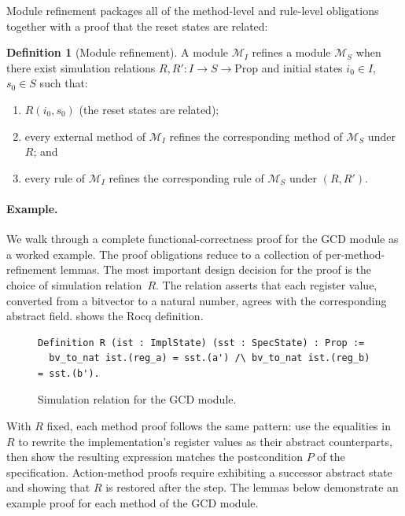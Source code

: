 \documentclass[fontset=fira-newtxsf]{mitthesis}
\theoremstyle{definition}
\newtheorem{definition}{Definition}[section]
\theoremstyle{plain}
\begin{document}
Module refinement packages all of the method-level and rule-level obligations together with a proof that the reset states are related:

\begin{definition}[Module refinement] \label{def:refines-module}
A module $\mathcal{M}_I$ refines a module $\mathcal{M}_S$ when there exist simulation relations $R, R' : I \to S \to \text{Prop}$ and initial states $i_0 \in I$, $s_0 \in S$ such that:
\begin{enumerate}
  \item $R(i_0, s_0)$ (the reset states are related);
  \item every external method of $\mathcal{M}_I$ refines the corresponding method of $\mathcal{M}_S$ under $R$; and
  \item every rule of $\mathcal{M}_I$ refines the corresponding rule of $\mathcal{M}_S$ under $(R, R')$.
\end{enumerate}
\end{definition}

\paragraph{Example.}
We walk through a complete functional-correctness proof for the GCD module as a worked example.
The proof obligations reduce to a collection of per-method-refinement lemmas.
The most important design decision for the proof is the choice of simulation relation~$R$.
The relation asserts that each register value, converted from a bitvector to a natural number, agrees with the corresponding abstract field.
 shows the Rocq definition.
\begin{figure}[H]
\begin{verbatim}
Definition R (ist : ImplState) (sst : SpecState) : Prop :=
  bv_to_nat ist.(reg_a) = sst.(a') /\ bv_to_nat ist.(reg_b) = sst.(b').
\end{verbatim}
\caption[GCD simulation relation]{Simulation relation for the GCD module.}
\label{fig:gcd-R}
\end{figure}
With $R$ fixed, each method proof follows the same pattern: use the equalities in $R$ to rewrite the implementation's register values as their abstract counterparts, then show the resulting expression matches the postcondition $P$ of the specification.
Action-method proofs require exhibiting a successor abstract state and showing that $R$ is restored after the step.
The lemmas below demonstrate an example proof for each method of the GCD module.
\end{document}

